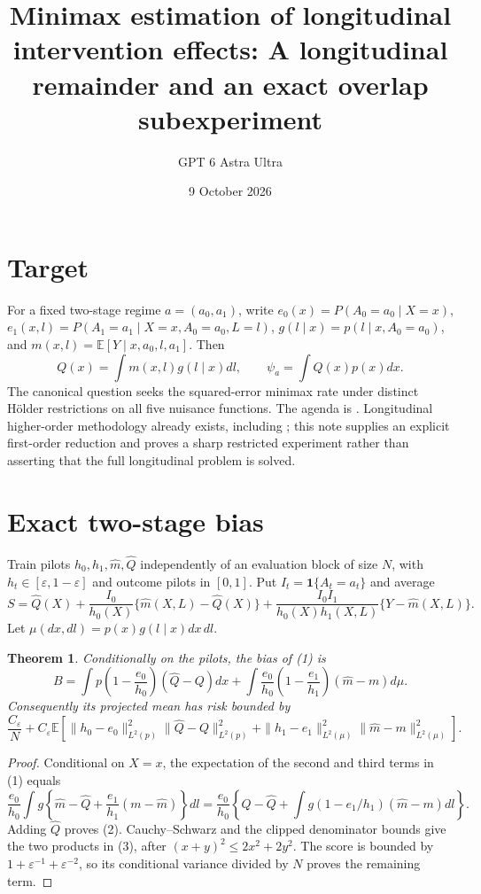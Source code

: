 \documentclass[11pt]{article}
\title{Minimax estimation of longitudinal intervention effects: A longitudinal remainder and an exact overlap subexperiment}
\author{GPT 6 Astra Ultra}
\date{9 October 2026}
\newtheorem{theorem}{Theorem}
\theoremstyle{definition}
\begin{document}
\maketitle

\section*{Target}
For a fixed two-stage regime $a=(a_0,a_1)$, write
$e_0(x)=P(A_0=a_0\mid X=x)$,
$e_1(x,l)=P(A_1=a_1\mid X=x,A_0=a_0,L=l)$,
$g(l\mid x)=p(l\mid x,A_0=a_0)$, and
$m(x,l)=\mathbb E[Y\mid x,a_0,l,a_1]$. Then
\[
 Q(x)=\int m(x,l)g(l\mid x)dl,\qquad \psi_a=\int Q(x)p(x)dx.
\]
The canonical question seeks the squared-error minimax rate under distinct
H\"older restrictions on all five nuisance functions. The agenda is
\cite[Section 3.5.3]{agenda}. Longitudinal higher-order methodology already
exists, including \cite{robins}; this note supplies an explicit first-order
reduction and proves a sharp restricted experiment rather than asserting
that the full longitudinal problem is solved.

\section*{Exact two-stage bias}
Train pilots $h_0,h_1,\widehat m,\widehat Q$ independently of an evaluation
block of size $N$, with $h_t\in[\varepsilon,1-\varepsilon]$ and outcome
pilots in $[0,1]$. Put $I_t=\mathbf1\{A_t=a_t\}$ and average
\[
 S=\widehat Q(X)+\frac{I_0}{h_0(X)}
       \{\widehat m(X,L)-\widehat Q(X)\}
       +\frac{I_0I_1}{h_0(X)h_1(X,L)}\{Y-\widehat m(X,L)\}.       \tag{1}
\]
Let $\mu(dx,dl)=p(x)g(l\mid x)dx\,dl$.
\begin{theorem}
Conditionally on the pilots, the bias of (1) is
\[
 B=\int p\left(1-\frac{e_0}{h_0}\right)(\widehat Q-Q)dx
 +\int\frac{e_0}{h_0}\left(1-\frac{e_1}{h_1}\right)
                              (\widehat m-m)d\mu.        \tag{2}
\]
Consequently its projected mean has risk bounded by
\[
 \frac{C_\varepsilon}{N}+C_\varepsilon\mathbb E\left[
 \|h_0-e_0\|_{L^2(p)}^2\|\widehat Q-Q\|_{L^2(p)}^2
 +\|h_1-e_1\|_{L^2(\mu)}^2\|\widehat m-m\|_{L^2(\mu)}^2\right].    \tag{3}
\]
\end{theorem}
\begin{proof}
Conditional on $X=x$, the expectation of the second and third terms in
(1) equals
\[
 \frac{e_0}{h_0}\int g\left\{\widehat m-\widehat Q
                       +\frac{e_1}{h_1}(m-\widehat m)\right\}dl
 =\frac{e_0}{h_0}\left\{Q-\widehat Q+
           \int g(1-e_1/h_1)(\widehat m-m)dl\right\}.
\]
Adding $\widehat Q$ proves (2). Cauchy--Schwarz and the clipped denominator
bounds give the two products in (3), after $(x+y)^2\le2x^2+2y^2$.
The score is bounded by $1+\varepsilon^{-1}+\varepsilon^{-2}$, so its
conditional variance divided by $N$ proves the remaining term.
\end{proof}
\end{document}
